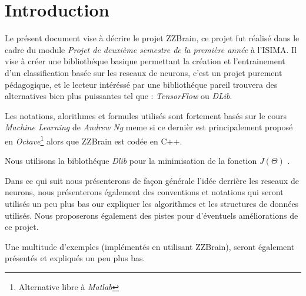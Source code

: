 \section{Introduction}

Le présent document vise à décrire le projet ZZBrain, ce projet fut réalisé dans le cadre du module \textit{Projet de deuxième semestre de la première année} à l'ISIMA. Il vise à créer une bibliothéque basique permettant la création et l'entrainement d'un classification basée sur les reseaux de neurons, c'est un projet purement pédagogique, et le lecteur intéréssé par une bibliothéque pareil trouvera des alternatives bien plus puissantes tel que : \textit{TensorFlow} ou \textit{DLib}.

Les notations, alorithmes et formules utilisés sont fortement basés sur le cours \textit{Machine Learning} de \textit{Andrew Ng} meme si ce dernièr est principalement proposé en \textit{Octave}\footnote{Alternative libre à \textit{Matlab}} alors que ZZBrain est codée en C++.

Nous utilisons la biblothéque \textit{Dlib} pour la minimisation de la fonction $J(\Theta)$ .

Dans ce qui suit nous présenterons de façon générale l'idée derrière les reseaux de neurons, nous présenterons également des conventions et notations qui seront utilisés un peu plus bas our expliquer les algorithmes et les structures de données utilisés.
Nous proposerons également des pistes pour d'éventuels améliorations de ce projet.

Une multitude d'exemples (implémentés en utilisant ZZBrain), seront également présentés et expliqués un peu plus bas.
